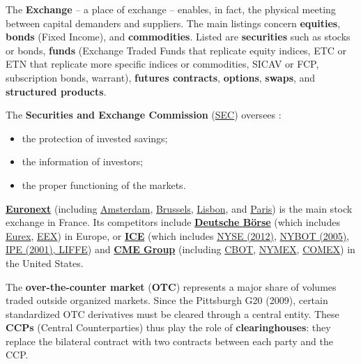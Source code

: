 \def\scaleBS{.95}

\begin{f}
	
The \textbf{Exchange} – a place of exchange – enables, in fact, the physical meeting between capital demanders and suppliers.
The main listings concern \textbf{equities}, \textbf{bonds} (Fixed Income), and \textbf{commodities}.
Listed are \textbf{securities} such as stocks or bonds, \textbf{funds} (Exchange Traded Funds that replicate equity indices, ETC or ETN that replicate more specific indices or commodities, SICAV or FCP, subscription bonds, warrant), \textbf{futures contracts}, \textbf{options}, \textbf{swaps}, and \textbf{structured products}.

The \textbf{Securities and Exchange Commission} (\href{https://www.sec.gov/}{SEC}) oversees :
\begin{itemize}
	\item the protection of invested savings; 
	\item the information of investors; 
	\item the proper functioning of the markets.
\end{itemize}

\textbf{\href{https://www.euronext.com/fr}{Euronext}} (including
\href{https://www.euronext.com/en/markets/amsterdam}{Amsterdam}, 
\href{https://www.euronext.com/en/markets/brussels}{Brussels}, 
\href{https://www.euronext.com/en/markets/lisbon}{Lisbon}, 
and \href{https://www.euronext.com/en/markets/paris}{Paris}) is the main stock exchange in France.
%
Its competitors include \textbf{\href{https://www.deutsche-boerse.com/dbg-en/}{Deutsche Börse}} 
(which includes \href{https://www.eurex.com/}{Eurex}, 
\href{https://www.eex.com/en/}{EEX}) in Europe,
%
or \textbf{\href{https://www.ice.com/}{ICE}} (which includes
\href{https://www.nyse.com/index}{NYSE (2012)}, 
\href{https://www.ice.com/about/history}{NYBOT (2005)}, 
\href{https://www.ice.com/futures-europe}{IPE (2001), LIFFE})
%
and \textbf{\href{https://www.cmegroup.com/}{CME Group}} (including
\href{https://www.cmegroup.com/company/cbot.html}{CBOT}, 
\href{https://www.cmegroup.com/company/nymex.html}{NYMEX}, 
\href{https://www.cmegroup.com/company/comex.html}{COMEX}) in the United States.

The \textbf{over-the-counter market} (\textbf{OTC}) represents a major share of volumes traded outside organized markets.
Since the Pittsburgh G20 (2009), certain standardized OTC derivatives must be cleared through a central entity.
These \textbf{CCPs} (Central Counterparties) thus play the role of \textbf{clearinghouses}: they replace the bilateral contract with two contracts between each party and the CCP.


\end{f}
